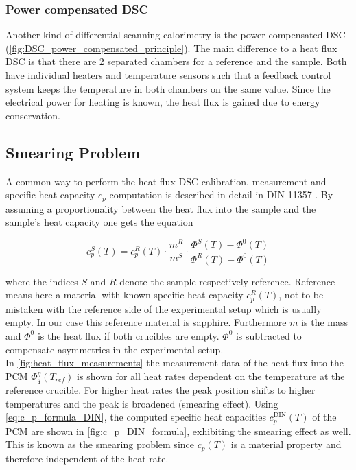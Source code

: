 \documentclass{scrartcl}[12pt, halfparskip]
\numberwithin{equation}{section}
\numberwithin{figure}{section}
\numberwithin{table}{section}
\begin{document}
\subsubsection{Power compensated DSC}
\label{sec:power_compensated_dsc}
Another kind of differential scanning calorimetry is the
power compensated DSC (\cref{fig:DSC_power_compensated_principle}). 
The main difference to a heat flux DSC is that there are 2 separated chambers for a reference and the sample. Both have individual heaters and temperature sensors such that a feedback control system keeps the temperature in both chambers on the same value. Since the electrical power for heating is known, the heat flux is gained due to energy conservation. \\


\subsection{Smearing Problem}
\label{sec:smearing_problem}
A common way to perform the heat flux DSC calibration, measurement and specific heat capacity $c_p$ computation is described in detail in DIN 11357 \cite{DIN_11357}. By assuming a proportionality between the heat flux into the sample and the sample's heat capacity one gets the equation

\begin{equation}
	c_p^S(T) = c_p^{R}(T) \cdot \frac{m^R}{m^S} \cdot \frac{\varPhi^S(T) - \varPhi^0(T)}{\varPhi^R(T) - \varPhi^0(T)}
	\label{eq:c_p_formula_DIN}
\end{equation}

where the indices $S$ and $R$ denote the sample respectively reference. Reference means here a material with known specific heat capacity $c_p^R(T)$, not to be mistaken with the reference side of the experimental setup which is usually empty. In our case this reference material is sapphire. Furthermore $m$ is the mass and $\varPhi^0$ is the heat flux if both crucibles are empty. $\varPhi^0$ is subtracted to compensate asymmetries in the experimental setup. \\
In \cref{fig:heat_flux_measurements} the measurement data of the heat flux into the PCM $\varPhi_q^{\eta}(T_{ref})$ is shown for all heat rates dependent on the temperature at the reference crucible. For higher heat rates the peak position shifts to higher temperatures and the peak is broadened (smearing effect). Using \cref{eq:c_p_formula_DIN}, the computed specific heat capacities $c_p^{\text{DIN}}(T)$ of the PCM are shown in \cref{fig:c_p_DIN_formula}, exhibiting the smearing effect as well. This is known as the smearing problem since $c_p(T)$ is a material property and therefore independent of the heat rate.
\end{document}
